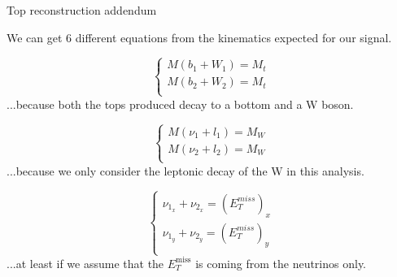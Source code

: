 \documentclass[handout,8 pt]{beamer}
\newcommand{\backupbegin}{
   \newcounter{finalframe}
   \setcounter{finalframe}{\value{framenumber}}
}
\begin{document}
\appendix
	\backupbegin
	
\begin{frame}{Top reconstruction addendum}

   	\justifying
	We can get 6 different equations from the kinematics expected for our signal. \vspace{5pt}
	
	\begin{minipage}[c]{.30\linewidth}
        \begin{equation*}
     	\begin{cases}
		M(b_1 + W_1) = M_t \\
		M(b_2 + W_2) = M_t \\
     	\end{cases}
	\end{equation*}
	\justifying
	...because both the tops produced decay to a bottom and a W boson. \\
   \end{minipage} \hfill
   \hspace{8pt}
   \begin{minipage}[c]{.3\linewidth}
   	\begin{equation*}
     	\begin{cases}
        		M(\nu_1 + l_1) = M_W \\
		M(\nu_2 + l_2) = M_W \\
     	\end{cases}
	\end{equation*}
	\justifying
	...because we only consider the leptonic decay of the W in this analysis. \\
   \end{minipage} \hfill
   \hspace{8pt}
   \begin{minipage}[c]{.3\linewidth}
   	\begin{equation*}
     	\begin{cases}
        		\nu_{1_x} + \nu_{2_x} = (E_T^{miss})_x \\
		\nu_{1_y} + \nu_{2_y} = (E_T^{miss})_y \\
     	\end{cases}
	\end{equation*}
	\justifying
	...at least if we assume that the $E_T^{\text{miss}}$ is coming from the neutrinos only. \\
   \end{minipage} \hfill


\end{frame}
\end{document}
